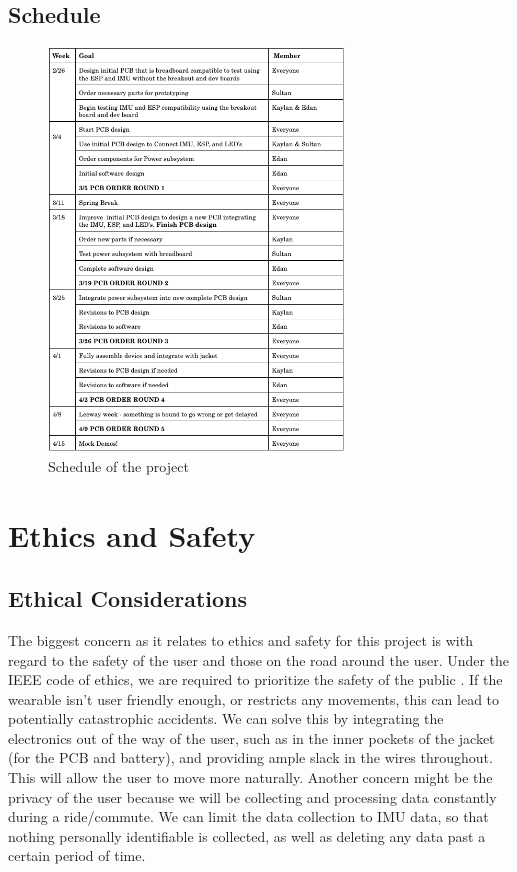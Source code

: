 \documentclass[12pt]{article}
\begin{document}
\newpage
\subsection{Schedule}
\begin{figure}[ht]
    \centering
    \includegraphics[width=0.70\textwidth]{schedule.png}
    \caption{Schedule of the project}
    \label{fig:my_label3}
\end{figure}
\section{Ethics and Safety}
\subsection{Ethical Considerations}
The biggest concern as it relates to ethics and safety for 
this project is with regard to the safety of the user and 
those on the road around the user. Under the IEEE code of 
ethics, we are required to prioritize the 
safety of the public \cite{IEEEethics2024}. If the wearable isn’t user
friendly enough, or restricts any movements, this can lead 
to potentially catastrophic accidents. We can solve this by 
integrating the electronics out of the way of the user, 
such as in the inner pockets of the jacket (for the PCB 
and battery), and providing ample slack in the wires 
throughout. This will allow the user to move more naturally.
Another concern might be the privacy of the user \cite{IEEEethics2024}
because we will be collecting and processing data constantly 
during a ride/commute. We can limit the data collection to 
IMU data, so that nothing personally identifiable is
collected, as well as deleting any data past a certain 
period of time. 
\end{document}

